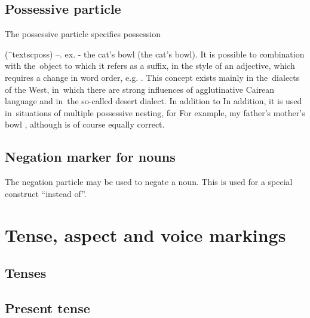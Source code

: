
\subsection{Possessive particle}

The possessive particle  specifies possession

(¯textsc{poss}) --.
ex.  - the cat's bowl (the cat's bowl). It is possible to
combination with the~object to which it refers as a suffix, in the style of an
adjective, which requires a change in word order, e.g. .
This concept exists mainly in the~dialects of the West, in~which there are strong influences of
agglutinative Cairean language and in~the so-called desert dialect. In addition to
In addition, it is used in~situations of multiple possessive nesting, for
For example, my father's mother's bowl ,
although  is of course equally
correct.

\subsection{Negation marker for nouns}

The negation particle  may be used to negate a noun. This is used for
a special construct ``instead of''.


\section{Tense, aspect and voice markings}
\label{sec:markers}

\subsection{Tenses}

\subsection{Present tense}


